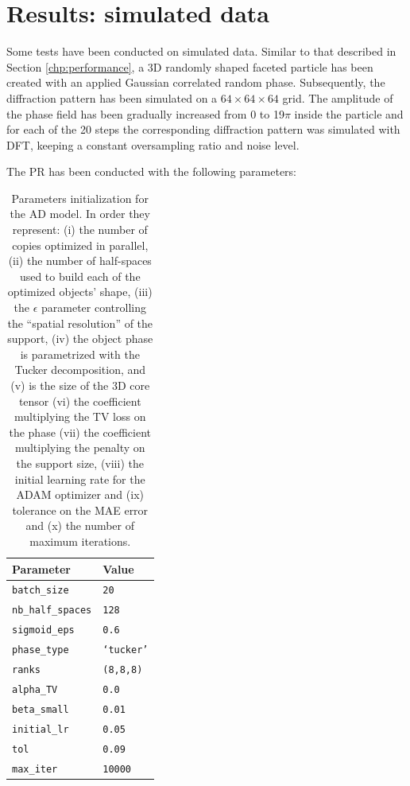 \section{Results: simulated data}
Some tests have been conducted on simulated data. Similar to that described in Section \ref{chp:performance}, a 3D 
randomly shaped faceted particle has been created with an applied Gaussian correlated random phase. Subsequently, 
the diffraction pattern has been simulated on a $64\times 64\times 64$ grid. The amplitude of the phase field has been 
gradually increased from 0 to 19$\pi$ inside the particle and for each of the 20 steps the corresponding diffraction pattern 
was simulated with DFT, keeping a constant oversampling ratio and noise level. 

The PR has been conducted with the following parameters: 
\begin{table}[H] 

  \centering
  {%
    \begin{tabular}{|l|l|}
      \hline
      \textbf{Parameter} & \textbf{Value} \\
      \hline 
      \texttt{batch\_size}                      & \texttt{20} \\
      \texttt{nb\_half\_spaces}                 & \texttt{128} \\
      \texttt{sigmoid\_eps}                     & \texttt{0.6} \\
      \texttt{phase\_type}                      & \texttt{`tucker'} \\
      \texttt{ranks}                            & \texttt{(8,8,8)} \\
      \texttt{alpha\_TV}                        & \texttt{0.0} \\
      \texttt{beta\_small}                      & \texttt{0.01} \\
      \texttt{initial\_lr}                      & \texttt{0.05} \\
      \texttt{tol}                              & \texttt{0.09} \\
      \texttt{max\_iter}                        & \texttt{10000} \\

      \hline
    \end{tabular}%
  } 
  \caption{Parameters initialization for the AD model. In order they represent: (i) the number of copies optimized in 
  parallel, (ii) the number of half-spaces used to build each of the optimized objects' shape, (iii) the $\epsilon$ parameter 
  controlling the ``spatial resolution'' of the support, (iv) the object phase is parametrized with the Tucker decomposition, 
  and (v) is the size of the 3D core tensor (vi) the coefficient multiplying the TV loss on the phase (vii) the coefficient multiplying 
  the penalty on the support size, (viii) the initial learning rate for the ADAM optimizer and (ix) tolerance on the MAE error and (x) 
  the number of maximum iterations.}
  \label{table:AD1}
\end{table}

